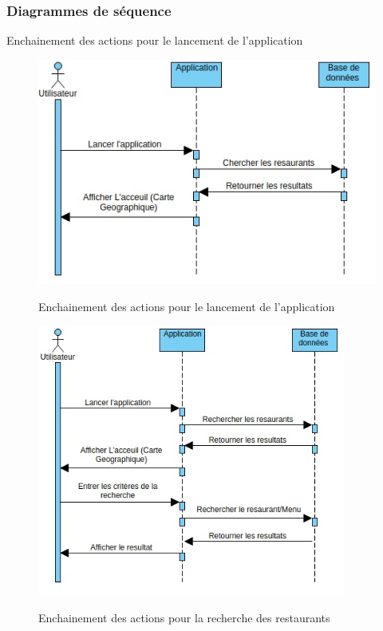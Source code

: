 \subsubsection{Diagrammes de séquence}
Enchainement des actions pour le lancement de l'application
\begin{figure}[!ht]

    \centering
    \includegraphics[width=5in]{images/Chapitre3/enchainement_lancement_application.jpg}
    \label{fig:umllancement}
    \caption{Enchainement des actions pour le lancement de l'application}
\end{figure}

\begin{figure}[!ht]

    \centering
    \includegraphics[width=4in]{images/Chapitre3/enchainement_recherche_resto_menu.jpg}
    \label{fig:label1}
    \caption{Enchainement des actions pour la recherche des restaurants}
\end{figure}

